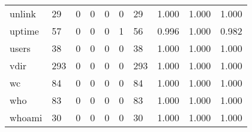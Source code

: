 \begin{longtable}{lp{2.0cm}p{2.0cm}p{2.0cm}p{2.0cm}p{2.0cm}p{2.0cm}p{2.0cm}p{2.0cm}p{2.0cm}}
unlink    &                     29 &                                             0 &                                            0 &                                           0 &                                            0 &                                         29 &                                1.000 &                                  1.000 &                                1.000 \\
uptime    &                     57 &                                             0 &                                            0 &                                           0 &                                            1 &                                         56 &                                0.996 &                                  1.000 &                                0.982 \\
users     &                     38 &                                             0 &                                            0 &                                           0 &                                            0 &                                         38 &                                1.000 &                                  1.000 &                                1.000 \\
vdir      &                    293 &                                             0 &                                            0 &                                           0 &                                            0 &                                        293 &                                1.000 &                                  1.000 &                                1.000 \\
wc        &                     84 &                                             0 &                                            0 &                                           0 &                                            0 &                                         84 &                                1.000 &                                  1.000 &                                1.000 \\
who       &                     83 &                                             0 &                                            0 &                                           0 &                                            0 &                                         83 &                                1.000 &                                  1.000 &                                1.000 \\
whoami    &                     30 &                                             0 &                                            0 &                                           0 &                                            0 &                                         30 &                                1.000 &                                  1.000 &                                1.000 \\

\end{longtable}
